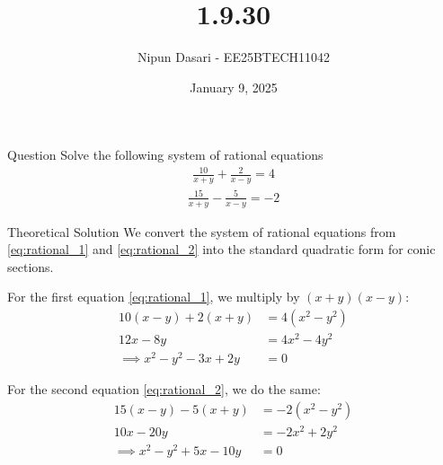 \documentclass{beamer}
\title %
{1.9.30}
\date{January 9, 2025}
\author %
{Nipun Dasari - EE25BTECH11042}
\begin{document}
	
	\frame{\titlepage}
	\begin{frame}{Question}
	Solve the following system of rational equations
	\begin{align}
		\frac{10}{x+y}+\frac{2}{x-y} = 4
	\end{align}
	\begin{align}
		\frac{15}{x+y}-\frac{5}{x-y} = -2
	\end{align}
	
	\end{frame}
	
	
	\begin{frame}{Theoretical Solution}
			We convert the system of rational equations from \eqref{eq:rational_1} and \eqref{eq:rational_2} into the standard quadratic form for conic sections.
		
		For the first equation \eqref{eq:rational_1}, we multiply by $(x+y)(x-y)$:
		\begin{align}
			10(x-y) + 2(x+y) &= 4(x^2 - y^2) \nonumber \\
			12x - 8y &= 4x^2 - 4y^2 \nonumber \\
			\implies x^2 - y^2 - 3x + 2y &= 0 \label{eq:H1}
		\end{align}
		
		For the second equation \eqref{eq:rational_2}, we do the same:
		\begin{align}
			15(x-y) - 5(x+y) &= -2(x^2 - y^2) \nonumber \\
			10x - 20y &= -2x^2 + 2y^2 \nonumber \\
			\implies x^2 - y^2 + 5x - 10y &= 0 \label{eq:H2}
		\end{align}
	\end{frame}
\end{document}
